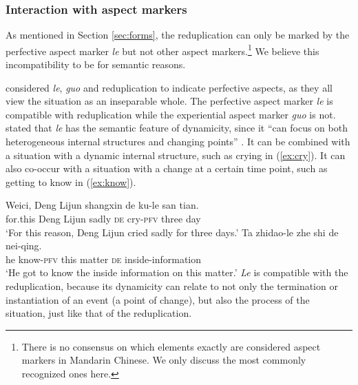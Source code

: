 \ea %
\label{ex:syn-quan}
\z
\z



\subsubsection{Interaction with aspect markers}\label{sec:aspM}

As mentioned in Section \ref{sec:forms}, the reduplication can only be marked by the perfective aspect marker \textit{le} but not other aspect markers.\footnote{
There is no consensus on which elements exactly are considered aspect markers in Mandarin Chinese. We only discuss the most commonly recognized ones here.
}
We believe this incompatibility to be for semantic reasons.

\citet[Ch. 4]{XiaoMcEnery2004} considered \textit{le}, \textit{guo} and reduplication to indicate perfective aspects, as they all view the situation as an inseparable whole.
The perfective aspect marker \textit{le} is compatible with reduplication while the experiential aspect marker \textit{guo} is not.
\citet[128--131]{XiaoMcEnery2004} stated that \textit{le} has the semantic feature of dynamicity, since it ``can focus on both heterogeneous internal structures and changing points'' \citep[129]{XiaoMcEnery2004}.
It can be combined with a situation with a dynamic internal structure, such as crying in (\ref{ex:cry}).
It can also co\hyp{}occur with a situation with a change at a certain time point, such as getting to know in (\ref{ex:know}).

\settowidth{}

\ea
  \ea\label{ex:cry}
    \gll Weici, Deng Lijun shangxin de ku-le san tian.\\
    for.this Deng Lijun sadly \textsc{de} cry-\textsc{pfv} three day\\ 
    \glt `For this reason, Deng Lijun cried sadly for three days.'
  \ex\label{ex:know}
    \gll Ta zhidao-le zhe shi de nei-qing.\\
    he know-\textsc{pfv} this matter \textsc{de} inside-information\\ 
    \glt `He got to know the inside information on this matter.'
  \z
\z
\textit{Le} is compatible with the reduplication, because its dynamicity can relate to not only the termination or instantiation of an event (a point of change), but also the process of the situation, just like that of the reduplication.

